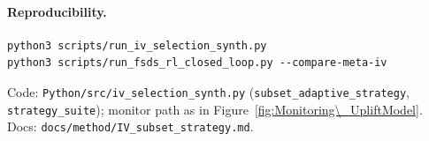 \documentclass{article}
\begin{document}
\paragraph{Reproducibility.}
\begin{verbatim}
python3 scripts/run_iv_selection_synth.py
python3 scripts/run_fsds_rl_closed_loop.py --compare-meta-iv
\end{verbatim}
Code: \texttt{Python/src/iv\_selection\_synth.py}
(\texttt{subset\_adaptive\_strategy}, \texttt{strategy\_suite});
monitor path as in Figure~\ref{fig:Monitoring\_UpliftModel}.
Docs: \texttt{docs/method/IV\_subset\_strategy.md}.
\end{document}
